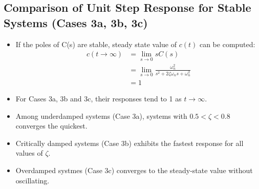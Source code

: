 \documentclass[a4paper]{article}
\begin{document}
\subsection{Comparison of Unit Step Response for Stable Systems (Cases 3a, 3b, 3c)}
\begin{itemize}
    \item If the poles of C(s) are stable, steady state value of $c(t)$ can be computed:
    \begin{align*}
        c(t\to\infty)&= \lim_{s\to 0}sC(s)\\
        &= \lim_{s\to 0}\frac{\omega_n^2}{s^2+2\zeta\omega_n s+\omega_n^2}\\
        &= 1
    \end{align*}
    \item For Cases 3a, 3b and 3c, their responses tend to 1 as $t\to\infty$.
    \item Among underdamped systems (Case 3a), systems with $0.5<\zeta<0.8$ converges the quickest.
    \item Critically damped systems (Case 3b) exhibits the fastest response for all values of $\zeta$.
    \item Overdamped systmes (Case 3c) converges to the steady-state value without oscillating.
\end{itemize}
\end{document}
